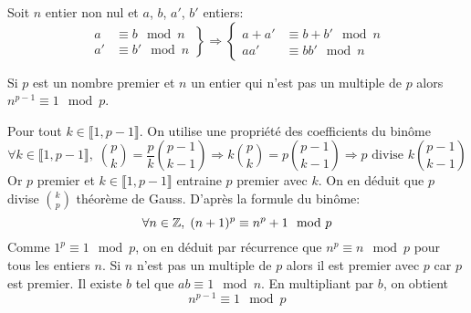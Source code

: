 \begin{propn}
\begin{prop}
  Soit $n$ entier non nul et $a$, $b$, $a'$, $b'$ entiers:
\begin{displaymath}
  \left. 
  \begin{aligned}
    a &\equiv b \mod n \\ a' &\equiv b' \mod n
  \end{aligned}
\right\rbrace \Rightarrow
\left\lbrace 
  \begin{aligned}
    a + a' &\equiv b + b' \mod n \\ a  a' &\equiv b b' \mod n
  \end{aligned}
\right. 
\end{displaymath}
\end{prop}
\begin{prop}
  Si $p$ est un nombre premier et $n$ un entier qui n'est pas un multiple de $p$ alors $n^{p-1} \equiv 1 \mod p$.
\end{prop}
\begin{demo}
  Pour tout $k\in \llbracket 1, p-1 \rrbracket$. On utilise une propriété des coefficients du binôme
\begin{displaymath}
  \forall k\in \llbracket 1, p-1 \rrbracket,\;
\binom{p}{k} = \frac{p}{k} \binom{p-1}{k-1} \Rightarrow k\binom{p}{k} = p \binom{p-1}{k-1} \Rightarrow p \text{ divise } k \binom{p-1}{k-1}
\end{displaymath}
Or $p$ premier et $k\in \llbracket 1, p-1 \rrbracket$ entraine $p$ premier avec $k$. On en déduit que $p$ divise $\binom{k}{p}$  théorème de Gauss.\newline
D'après la formule du binôme:
\begin{displaymath}
  \forall n \in\mathbb{Z}, \; (n+1)^p \equiv n^p + 1 \mod p
\end{displaymath}
Comme $1^p \equiv 1 \mod p$, on en déduit par récurrence que $n^p \equiv n \mod p$ pour tous les entiers $n$. Si $n$ n'est pas un multiple de $p$ alors il est premier avec $p$ car $p$ est premier. Il existe $b$ tel que $ab \equiv 1 \mod n$. En multipliant par $b$, on obtient
\begin{displaymath}
  n^{p-1} \equiv 1 \mod p
\end{displaymath}
\end{demo}


\end{propn}
